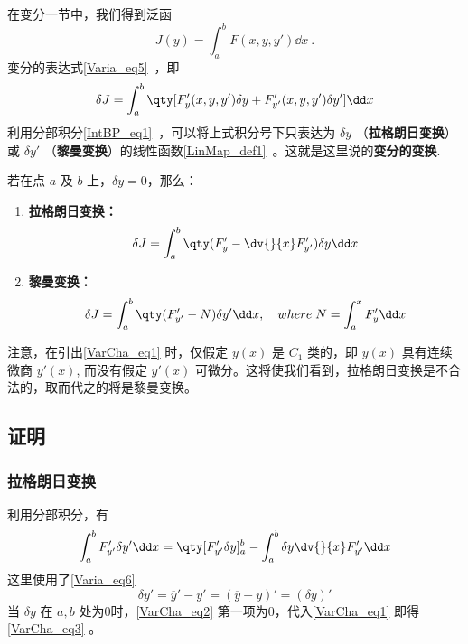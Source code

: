 
在变分一节中，我们得到泛函 
\begin{equation}
J(y)=\int_a^bF(x,y,y')\dd x~.
\end{equation}
变分的表达式\autoref{Varia_eq5}~，即
\begin{equation}\label{VarCha_eq1}
\delta J=\int_a^b\qty[F'_y(x,y,y')\delta y+F'_{y'}(x,y,y')\delta y']\dd x
\end{equation}
利用分部积分\autoref{IntBP_eq1}~，可以将上式积分号下只表达为 $\delta y$ （\textbf{拉格朗日变换}）或 $\delta y'$ （\textbf{黎曼变换}）的线性函数\autoref{LinMap_def1}~。这就是这里说的\textbf{变分的变换}.

若在点 $a$ 及 $b$ 上，$\delta y=0$，那么：
\begin{enumerate}
\item \textbf{拉格朗日变换：}
\begin{equation}\label{VarCha_eq3}
\delta J=\int_a^b\qty(F'_y-\dv{}{x}F'_{y'})\delta y\dd x
\end{equation}
\item \textbf{黎曼变换：}
\begin{equation}\label{VarCha_eq4}
\delta J=\int_a^b\qty(F'_{y'}-N)\delta y'\dd x ,\quad where \;N=\int_a^xF'_y\dd x
\end{equation}
\end{enumerate}


注意，在引出\autoref{VarCha_eq1} 时，仅假定 $y(x)$ 是 $C_1$ 类的，即 $y(x)$ 具有连续微商 $y'(x)$, 而没有假定 $y'(x)$ 可微分。这将使我们看到，拉格朗日变换是不合法的，取而代之的将是黎曼变换。 

\subsection{证明}
\subsubsection{拉格朗日变换}
利用分部积分，有
\begin{equation}\label{VarCha_eq2}
\int_a^bF'_{y'}\delta y'\dd x=\qty[F'_{y'}\delta y]_a^b-\int_a^b\delta y\dv{}{x}F'_{y'}\dd x
\end{equation}
这里使用了\autoref{Varia_eq6}~
\begin{equation}\label{VarCha_eq5}
\delta y'=\overline{y}'-y'=(\overline{y}-y)'=(\delta y)'
\end{equation}
当 $\delta y$ 在 $a,b$ 处为0时，\autoref{VarCha_eq2} 第一项为0，代入\autoref{VarCha_eq1} 即得\autoref{VarCha_eq3} 。

